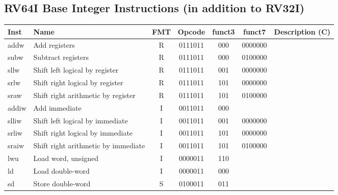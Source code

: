 
\subsection*{RV64I Base Integer Instructions (in addition to RV32I)}
\begin{center}
    
\begin{tabular}
{T | l | c | c | c | c | T} \hline
\rm Inst & Name                    & FMT & \rm Opcode & \rm funct3 & \rm funct7 & \rm Description (C)          \\ \hline
addw     & Add registers   & R   & 0111011    & 000    & 0000000   &                \\
subw     & Subtract registers & R   & 0111011    & 000    & 0100000   &             \\
sllw     & Shift left logical by register & R   & 0111011    & 001    & 0000000   &                \\
srlw     & Shift right logical by register & R   & 0111011    & 101    & 0000000   &               \\
sraw     & Shift right arithmetic by register & R   & 0111011    & 101    & 0100000   &        \\
addiw    & Add immediate & I   & 0011011    & 000    &    &        \\
slliw    & Shift left logical by immediate & I   & 0011011    & 001    & 0000000   &        \\
srliw    & Shift right logical by immediate & I   & 0011011    & 101    & 0000000   &          \\
sraiw    & Shift right arithmetic by immediate & I   & 0011011    & 101    & 0100000       &          \\
\hline
lwu      & Load word, unsigned  & I   & 0000011    & 110    &    &                \\
ld       & Load double-word     & I   & 0000011    & 000    &    &                \\
sd       & Store double-word    & S   & 0100011    & 011    &    &             \\

\end{tabular}
\end{center}

